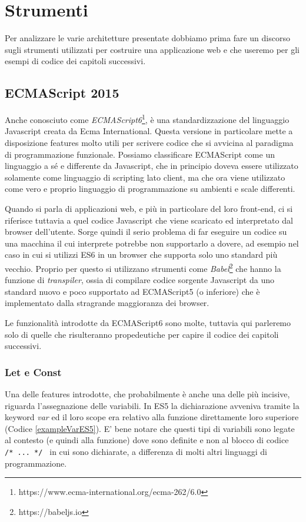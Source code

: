 \chapter{Strumenti}
Per analizzare le varie architetture presentate dobbiamo prima fare un discorso sugli strumenti utilizzati per costruire una applicazione web e che useremo per gli esempi di codice dei capitoli successivi.

\section{ECMAScript 2015}
Anche conosciuto come \textit{ECMAScript6}\footnote{https://www.ecma-international.org/ecma-262/6.0}, è una standardizzazione del linguaggio Javascript creata da Ecma International. Questa versione in particolare mette a disposizione features molto utili per scrivere codice che si avvicina al paradigma di programmazione funzionale. Possiamo classificare ECMAScript come un linguaggio a sé e differente da Javascript, che in principio doveva essere utilizzato solamente come linguaggio di scripting lato client, ma che ora viene utilizzato come vero e proprio linguaggio di programmazione su ambienti e scale differenti.
 
Quando si parla di applicazioni web, e più in particolare del loro front-end, ci si riferisce tuttavia a quel codice Javascript che viene scaricato ed interpretato dal browser dell'utente. Sorge quindi il serio problema di far eseguire un codice su una macchina il cui interprete potrebbe non supportarlo a dovere, ad esempio nel caso in cui si utilizzi ES6 in un browser che supporta solo uno standard più vecchio. Proprio per questo si utilizzano strumenti come \textit{Babel}\footnote{https://babeljs.io} che hanno la funzione di \textit{transpiler}, ossia di compilare codice sorgente Javascript da uno standard nuovo e poco supportato ad ECMAScript5 (o inferiore) che è implementato dalla stragrande maggioranza dei browser.

Le funzionalità introdotte da ECMAScript6 sono molte, tuttavia qui parleremo solo di quelle che risulteranno propedeutiche per capire il codice dei capitoli successivi.

\subsection{Let e Const}
Una delle features introdotte, che probabilmente è anche una delle più incisive, riguarda l'assegnazione delle variabili. In ES5 la dichiarazione avveniva tramite la keyword \textit{var} ed il loro scope era relativo alla funzione direttamente loro superiore (Codice \ref{exampleVarES5}). E' bene notare che questi tipi di variabili sono legate al contesto (e quindi alla funzione) dove sono definite e non al blocco di codice \texttt{{ /* ... */ }} in cui sono dichiarate, a differenza di molti altri linguaggi di programmazione.
 
